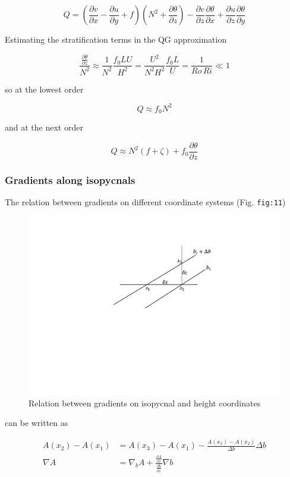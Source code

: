 \[Q = \left( \frac{\partial v}{\partial x} - \frac{\partial u}{\partial y} +f \right)\left(  N^2 + \frac{\partial \theta}{\partial z}\right) - \frac{\partial v}{\partial z}\frac{\partial \theta}{\partial x} +\frac{\partial u}{\partial z}\frac{\partial \theta}{\partial y}\]

Estimating the stratification terms in the QG approximation

\[\frac{\frac{\partial \theta}{\partial z}}{N^2} \approx \frac{1}{N^2}\frac{f_0 LU}{H^2} = \frac{U^2}{N^2H^2}\frac{f_0L}{U} = \frac{1}{ Ro \, Ri} \ll 1\]

so at the lowest order

\[Q \approx f_0 N^2\]

and at the next order

\[Q \approx N^2 ( f + \zeta) + f_0\frac{\partial \theta}{\partial z}\]

\subsubsection{Gradients along isopycnals}\label{gradients-along-isopycnals}

The relation between gradients on different coordinate systems (Fig.
\texttt{fig:11})

\begin{figure}
\centering
\includegraphics[width= .7 \textwidth]{figs/GD/grad.png}
\caption{Relation between gradients on isopycnal and height coordinates}
\label{fig:}
\end{figure}


can be written as

\[\begin{aligned}
A(x_2)-A(x_1) &= A(x_3)-A(x_1) - \frac{A(x_3)-A(x_2)}{\Delta b}\Delta b\\
\nabla A &= \nabla_b A + \frac{\frac{\partial A}{\partial z}}{\frac{\partial b}{\partial z}} \nabla b
\end{aligned}\]

